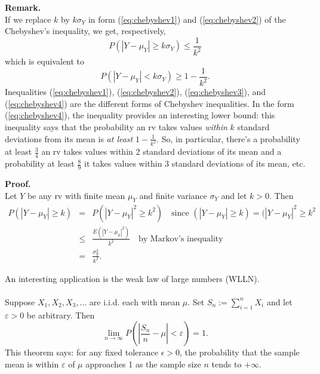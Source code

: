 \documentclass[12pt]{article}
\begin{document}
\noindent\textbf{Remark.} \\
If we replace $k$ by $k\sigma_Y$ in form (\ref{eq:chebyshev1}) and (\ref{eq:chebyshev2}) of the Chebyshev's inequality, we get, respectively,\\
\begin{equation} \label{eq:chebyshev3}
    P(|Y - \mu_Y| \geq k\sigma_Y) \leq \frac{1}{k^2}
\end{equation}
which is equivalent to
\begin{equation} \label{eq:chebyshev4}
    P(|Y - \mu_Y| < k\sigma_Y) \geq 1 - \frac{1}{k^2}.
\end{equation}
Inequalities (\ref{eq:chebyshev1}), (\ref{eq:chebyshev2}), (\ref{eq:chebyshev3}), and (\ref{eq:chebyshev4}) are the different forms of Chebyshev inequalities.  In the form (\ref{eq:chebyshev4}), the inequality provides an interesting lower bound: this inequality says that the probability an rv takes values {\em within} $k$ standard deviations from its mean is {\em at least} $1-\frac 1{k^2}$. So, in particular, there's a probability at least $\frac 34$ an rv takes values within 2 standard deviations of its mean and a probability at least $\frac 89$ it takes values within 3 standard deviations of its mean, etc.\\

\vspace{0.75cm}

\noindent\textbf{Proof.} \\
Let $Y$ be any rv with finite mean $\mu_Y$ and finite variance $\sigma_Y$ and let $k > 0$. Then
\begin{eqnarray*}
    P(|Y - \mu_Y| \geq k) &=& P(|Y - \mu_Y|^2 \geq k^2) \quad \text{since }(|Y - \mu_Y|\geq k)=(|Y - \mu_Y|^2\geq k^2\\
    & \leq&  \frac{E(|Y - \mu_k|^2)}{k^2} \quad \text{by Markov's inequality}\\
    &=& \frac{\sigma_Y^2}{k^2}.
\end{eqnarray*}


\newpage

\noindent An interesting application is the weak law of large numbers (WLLN).\\

\label{wlln}\\
Suppose $X_1, X_2, X_3, \dots$ are i.i.d. each with mean $\mu$. Set $S_n:=\sum_{i=1}^nX_i$ and let $\varepsilon > 0$ be arbitrary. Then
$$\lim_{n\to\infty} P\left(\left|\frac{S_n}{n}  - \mu\right| < \varepsilon\right) = 1.$$
This theorem says: for any fixed tolerance $\epsilon > 0$, the probability that the sample mean is within $\varepsilon$ of $\mu$ approaches 1 as the sample size $n$ tends to $+\infty$.
\end{document}
